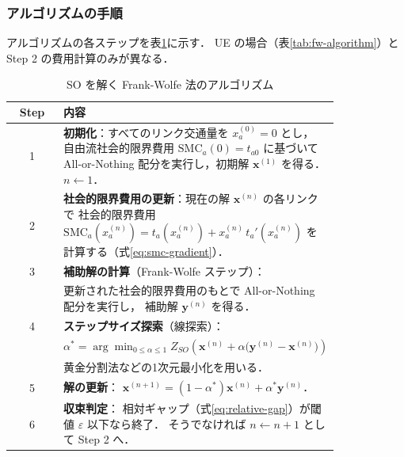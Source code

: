 \subsubsection*{アルゴリズムの手順}

アルゴリズムの各ステップを表\ref{tab:so-fw-algorithm}に示す．
UE の場合（表\ref{tab:fw-algorithm}）と Step 2 の費用計算のみが異なる．

\begin{table}[hbtp]
  \centering
  \caption{SO を解く Frank-Wolfe 法のアルゴリズム}
  \label{tab:so-fw-algorithm}
  \begin{tabular}{cp{0.82\linewidth}}
    \toprule
    Step & 内容 \\
    \midrule
    1 & \textbf{初期化}：すべてのリンク交通量を $x_a^{(0)}=0$ とし，
        自由流社会的限界費用 $\mathrm{SMC}_a(0)=t_{a0}$ に基づいて
        All-or-Nothing 配分を実行し，初期解 $\boldsymbol{x}^{(1)}$ を得る．$n \leftarrow 1$．
        \\[4pt]
    2 & \textbf{社会的限界費用の更新}：現在の解 $\boldsymbol{x}^{(n)}$ の各リンクで
        社会的限界費用
        $\mathrm{SMC}_a\!\left(x_a^{(n)}\right)
         = t_a\!\left(x_a^{(n)}\right) + x_a^{(n)}\,t_a'\!\left(x_a^{(n)}\right)$
        を計算する（式\eqref{eq:smc-gradient}）．
        \\[4pt]
    3 & \textbf{補助解の計算}（Frank-Wolfe ステップ）：\\
      & 更新された社会的限界費用のもとで All-or-Nothing 配分を実行し，
        補助解 $\boldsymbol{y}^{(n)}$ を得る．
        \\[4pt]
    4 & \textbf{ステップサイズ探索}（線探索）：\\
      & \quad $\alpha^* = \arg\min_{0 \leq \alpha \leq 1}
        Z_{SO}\!\left(\boldsymbol{x}^{(n)} + \alpha
        \bigl(\boldsymbol{y}^{(n)} - \boldsymbol{x}^{(n)}\bigr)\right)$\\[2pt]
      & 黄金分割法などの1次元最小化を用いる．
        \\[4pt]
    5 & \textbf{解の更新}：
        $\boldsymbol{x}^{(n+1)} = (1-\alpha^*)\boldsymbol{x}^{(n)}
        + \alpha^* \boldsymbol{y}^{(n)}$．
        \\[4pt]
    6 & \textbf{収束判定}：
        相対ギャップ（式\eqref{eq:relative-gap}）が閾値 $\varepsilon$ 以下なら終了．
        そうでなければ $n \leftarrow n+1$ として Step 2 へ．
        \\
    \bottomrule
  \end{tabular}
\end{table}

